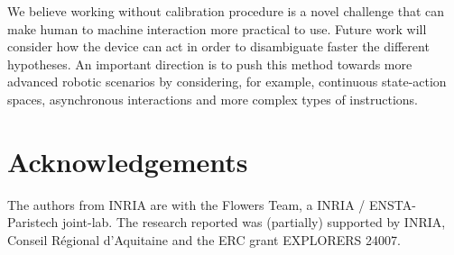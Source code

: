 \documentclass[conference]{IEEEtran}
\begin{document}
We believe working without calibration procedure is a novel challenge that can make human to machine interaction more practical to use. Future work will consider how the device can act in order to disambiguate faster the different hypotheses. An important direction is to push this method towards more advanced robotic scenarios by considering, for example, continuous state-action spaces, asynchronous interactions and more complex types of instructions.

\newpage

\section*{Acknowledgements}
The authors from INRIA are with the Flowers Team, a INRIA / ENSTA-Paristech joint-lab. The research reported was (partially) supported by INRIA, Conseil R\'egional d'Aquitaine and the ERC grant EXPLORERS 24007.



\end{document}
